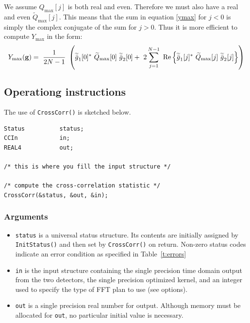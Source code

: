 \documentclass{article}
\begin{document}
We assume $Q_\mathrm{max}[j]$ is both real and even. Therefore we must also have a real and even
$\widetilde{Q}_\mathrm{max}[j]$.  
This means that the sum in equation \ref{ymax} for $j<0$
is simply the complex conjugate of the sum for $j>0$.
Thus it is more efficient to compute
$Y_\mathrm{max}$ in the form:
\begin{equation}\label{shortcut}
\sl{Y}_{\mathrm{max}}({ \bf{g} })=\
\frac{1}{2N-1}\
\left(
\widetilde{\bar{g}}_{1}[0]^*\
\widetilde{Q}_{\mathrm{max}}[0]\
\widetilde{\bar{g}}_{2}[0]+\
2\sum_{j=1}^{N-1}\
{\mathrm{Re}} \left\{
\widetilde{\bar{g}}_{1}[j]^*\
\widetilde{Q}_{\mathrm{max}}[j]\
\widetilde{\bar{g}}_{2}[j]
\right\}
\right)
\end{equation}

\subsection{Operationg instructions}

The use of {\tt CrossCorr()} is sketched below.

\begin{verbatim}
Status          status;
CCIn            in;
REAL4           out;

/* this is where you fill the input structure */

/* compute the cross-correlation statistic */
CrossCorr(&status, &out, &in); 
\end{verbatim}

\subsubsection{Arguments}

\begin{itemize}
\item
{\tt status\/} is a universal status structure.
Its contents are initially assigned by {\tt InitStatus()\/} and then
set by {\tt CrossCorr()\/} on return.
Non-zero status codes indicate an error condition as specified in
Table~\ref{t:errors}
\item
{\tt in\/} is the input structure containing the single precision 
time domain output from the two detectors, the single precision 
optimized kernel, and an integer used to specify the type of FFT plan to 
use (see options).
\item
{\tt out\/} is a single precision real number for output. Although memory 
must be allocated for {\tt out}, no particular initial value is necessary.
\end{itemize}
\end{document}
